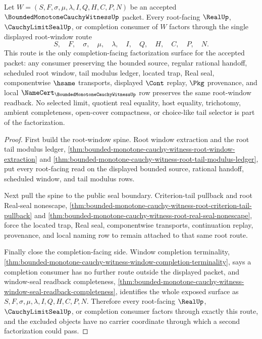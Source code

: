 \begin{theorem}
\label{thm:bounded-monotone-cauchy-witness-root-window-terminal-factorization}
Let $W=(S,F,\sigma,\mu,\lambda,I,Q,H,C,P,N)$ be an accepted $\BoundedMonotoneCauchyWitnessUp$ packet. Every root-facing $\RealUp$, $\CauchyLimitSealUp$, or completion consumer of $W$ factors through the single displayed root-window route
$$
S,\quad F,\quad \sigma,\quad \mu,\quad \lambda,\quad I,\quad Q,\quad H,\quad C,\quad P,\quad N.
$$
This route is the only completion-facing factorization surface for the accepted packet: any consumer preserving the bounded source, regular rational handoff, scheduled root window, tail modulus ledger, located trap, Real seal, componentwise $\hsame$ transports, displayed $\Cont$ replay, $\Pkg$ provenance, and local $\NameCert_{\BoundedMonotoneCauchyWitnessUp}$ row preserves the same root-window readback. No selected limit, quotient real equality, host equality, trichotomy, ambient completeness, open-cover compactness, or choice-like tail selector is part of the factorization.
\end{theorem}
\begin{proof}
First build the root-window spine. Root window extraction and the root tail modulus ledger, \autoref{thm:bounded-monotone-cauchy-witness-root-window-extraction} and \autoref{thm:bounded-monotone-cauchy-witness-root-tail-modulus-ledger}, put every root-facing read on the displayed bounded source, rational handoff, scheduled window, and tail modulus rows.

Next pull the spine to the public seal boundary. Criterion-tail pullback and root Real-seal nonescape, \autoref{thm:bounded-monotone-cauchy-witness-root-criterion-tail-pullback} and \autoref{thm:bounded-monotone-cauchy-witness-root-real-seal-nonescape}, force the located trap, Real seal, componentwise transports, continuation replay, provenance, and local naming row to remain attached to that same root route.

Finally close the completion-facing side. Window completion terminality, \autoref{thm:bounded-monotone-cauchy-witness-window-completion-terminality}, says a completion consumer has no further route outside the displayed packet, and window-seal readback completeness, \autoref{thm:bounded-monotone-cauchy-witness-window-seal-readback-completeness}, identifies the whole exposed surface as $S,F,\sigma,\mu,\lambda,I,Q,H,C,P,N$. Therefore every root-facing $\RealUp$, $\CauchyLimitSealUp$, or completion consumer factors through exactly this route, and the excluded objects have no carrier coordinate through which a second factorization could pass.
\end{proof}

